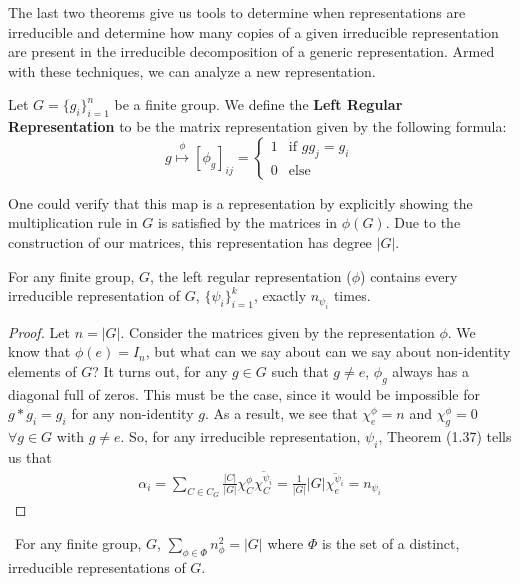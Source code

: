 The last two theorems give us tools to determine when representations are irreducible and determine how many copies of a given irreducible representation are present in the irreducible decomposition of a generic representation. Armed with these techniques, we can analyze a new representation.

\begin{definition}
	Let $G=\{g_i\}^n_{i=1}$ be a finite group. We define the \textbf{Left Regular Representation} to be the matrix representation given by the following formula:
$$g\stackrel{\phi}{\mapsto} [\phi_g]_{ij} = \begin{cases}
								1 & \text{if } gg_j = g_i \\
								0 & \text{else}
							\end{cases}$$
\end{definition}

One could verify that this map is a representation by explicitly showing the multiplication rule in $G$ is satisfied by the matrices in $\phi(G)$. Due to the construction of our matrices, this representation has degree $|G|$. 

\begin{theorem}
	For any finite group, $G$, the left regular representation ($\phi$) contains every irreducible representation of $G$, $\{\psi_i\}_{i=1}^k$, exactly $n_{\psi_i}$ times.
\end{theorem}

\noindent\begin{proof}\cite{Tung}  Let $n=|G|$. Consider the matrices given by the representation $\phi$. We know that $\phi(e) = I_n$, but what can we say about can we say about non-identity elements of $G$? It turns out, for any $g\in G$ such that $g\neq e$, $\phi_g$ always has a diagonal full of zeros. This must be the case, since it would be impossible for $g *g_i = g_i$  for any non-identity $g$. As a result, we see that $\chi^\phi_e = n$ and $\chi^\phi_g = 0$ $\forall g \in G$ with $g \neq e$. So, for any irreducible representation, $\psi_i$, Theorem (1.37) tells us that 
\begin{equation}
	\begin{aligned}
		\alpha_i = \sum_{C\in C_G} \frac{|C|}{|G|} \chi^\phi_C \overline{\chi_C^{\psi_i}} = \frac{1}{|G|}|G| \overline{\chi_e^{\psi_i}} = n_{\psi_i}
	\end{aligned}
\end{equation}
\end{proof}

\begin{corrolary}
\	For any finite group, $G$, $\sum_{\phi \in \Phi} n_\phi^2 = |G|$ where $\Phi$ is the set of a distinct, irreducible representations of $G$.
\end{corrolary}

